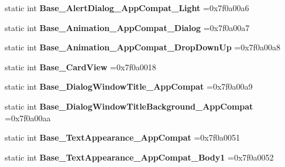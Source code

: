 \begin{DoxyCompactItemize}
\item 
\mbox{\label{classandroid_1_1support_1_1design_1_1R_1_1style_a6dd31cc09fae79e627844652990c80bd}} 
static int {\bfseries Base\+\_\+\+Alert\+Dialog\+\_\+\+App\+Compat\+\_\+\+Light} =0x7f0a00a6
\item 
\mbox{\label{classandroid_1_1support_1_1design_1_1R_1_1style_a68004544b65e812ccd1272182467fd82}} 
static int {\bfseries Base\+\_\+\+Animation\+\_\+\+App\+Compat\+\_\+\+Dialog} =0x7f0a00a7
\item 
\mbox{\label{classandroid_1_1support_1_1design_1_1R_1_1style_ac7bff605e51429176243b2ed879d0102}} 
static int {\bfseries Base\+\_\+\+Animation\+\_\+\+App\+Compat\+\_\+\+Drop\+Down\+Up} =0x7f0a00a8
\item 
\mbox{\label{classandroid_1_1support_1_1design_1_1R_1_1style_ac46ed27bcd02e42ffe646577a53417a8}} 
static int {\bfseries Base\+\_\+\+Card\+View} =0x7f0a0018
\item 
\mbox{\label{classandroid_1_1support_1_1design_1_1R_1_1style_ab1b7de6f974b02b96a5c246ad0746e2a}} 
static int {\bfseries Base\+\_\+\+Dialog\+Window\+Title\+\_\+\+App\+Compat} =0x7f0a00a9
\item 
\mbox{\label{classandroid_1_1support_1_1design_1_1R_1_1style_a5fbef8537010e364c509bd09160d95ff}} 
static int {\bfseries Base\+\_\+\+Dialog\+Window\+Title\+Background\+\_\+\+App\+Compat} =0x7f0a00aa
\item 
\mbox{\label{classandroid_1_1support_1_1design_1_1R_1_1style_a1a6c66eb4aa69bf804aeca9b9cc22dbc}} 
static int {\bfseries Base\+\_\+\+Text\+Appearance\+\_\+\+App\+Compat} =0x7f0a0051
\item 
\mbox{\label{classandroid_1_1support_1_1design_1_1R_1_1style_ad53ca3b29bc1b72a13909905a4d8bc75}} 
static int {\bfseries Base\+\_\+\+Text\+Appearance\+\_\+\+App\+Compat\+\_\+\+Body1} =0x7f0a0052

\end{DoxyCompactItemize}
